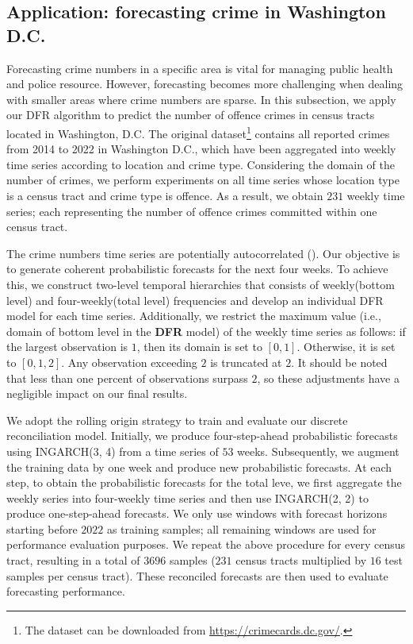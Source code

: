 \documentclass[a4paper,review,12pt,authoryear]{elsarticle}
\begin{document}
     \subsection{Application: forecasting crime in Washington D.C.}
     \label{sec:application_crime}
     
     Forecasting crime numbers in a specific area is vital for managing public health and police resource.
     However, forecasting becomes more challenging when dealing with smaller areas where crime numbers are sparse.
     In this subsection, we apply our DFR algorithm to predict the number of offence crimes in census tracts located in Washington, D.C. 
     The original dataset\footnote{The dataset can be downloaded from \url{https://crimecards.dc.gov/}.} contains all reported crimes from 2014 to 2022 in Washington D.C., which have been aggregated into weekly time series according to location and crime type. 
     Considering the domain of the number of crimes, we perform experiments on all time series whose location type is a census tract and crime type is offence.
     As a result, we obtain $231$ weekly time series; each representing the number of offence crimes committed within one census tract.
     
     The crime numbers time series are potentially autocorrelated (\citealp{aldor-noimanSpatioTemporalLowCount2013}). 
     Our objective is to generate coherent probabilistic forecasts for the next four weeks.
     To achieve this, we construct two-level temporal hierarchies that consists of weekly(bottom level) and four-weekly(total level) frequencies and develop an individual DFR model for each time series.
     Additionally, we restrict the maximum value (i.e., domain of bottom level in the \textbf{DFR} model) of the weekly time series as follows: if the largest observation is $1$, then its domain is set to $[0, 1]$. 
     Otherwise, it is set to $[0, 1, 2]$. 
     Any observation exceeding $2$ is truncated at $2$. 
     It should be noted that less than one percent of observations surpass $2$, so these adjustments have a negligible impact on our final results.
     
     We adopt the rolling origin strategy to train and evaluate our discrete reconciliation model. 
     Initially, we produce four-step-ahead probabilistic forecasts using INGARCH(3, 4) from a time series of $53$ weeks. 
     Subsequently, we augment the training data by one week and produce new probabilistic forecasts. 
     At each step, to obtain the probabilistic forecasts for the total leve, we first aggregate the weekly series into four-weekly time series and then use INGARCH(2, 2) to produce one-step-ahead forecasts.
     We only use windows with forecast horizons starting before $2022$ as training samples; all remaining windows are used for performance evaluation purposes.
     We repeat the above procedure for every census tract, resulting in a total of $3696$ samples ($231$ census tracts multiplied by $16$ test samples per census tract). 
     These reconciled forecasts are then used to evaluate forecasting performance. 
     
\end{document}
